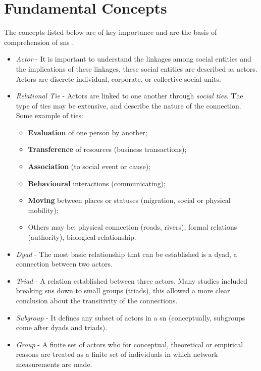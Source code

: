 \section{Fundamental Concepts}

The concepts listed below are of key importance and are the basis of comprehension of \glspl{sn} \citep{wasserman1994social}.

\begin{itemize}
    \item \emph{Actor} - It is important to understand the linkages among social entities and the implications of these linkages, these social entities are described as actors. Actors are discrete individual, corporate, or collective social units.
    \item \emph{Relational Tie} - Actors are linked to one another through \textit{social ties}. The type of ties may be extensive, and describe the nature of the connection. Some example of ties:
        \begin{itemize}
            \item \textbf{Evaluation} of one person by another;
            \item \textbf{Transference} of resources (business transactions);
            \item \textbf{Association} (to social event or cause);
            \item \textbf{Behavioural} interactions (communicating);
            \item \textbf{Moving} between places or statuses (migration, social or physical mobility);
            \item Others may be: physical connection (roads, rivers), formal relations (authority), biological relationship.
        \end{itemize}
    \item \emph{Dyad} - The most basic relationship that can be established is a dyad, a connection between two actors.
    \item \emph{Triad} - A relation established between three actors. Many studies included breaking \glspl{sn} down to small groups (triads), this allowed a more clear conclusion about the transitivity of the connections.
    \item \emph{Subgroup} - It defines any subset of actors in a \gls{sn} (conceptually, subgroups come after dyads and triads).
    \item \emph{Group} - A finite set of actors who for conceptual, theoretical or empirical reasons are treated as a finite set of individuals in which network measurements are made.

\end{itemize}
